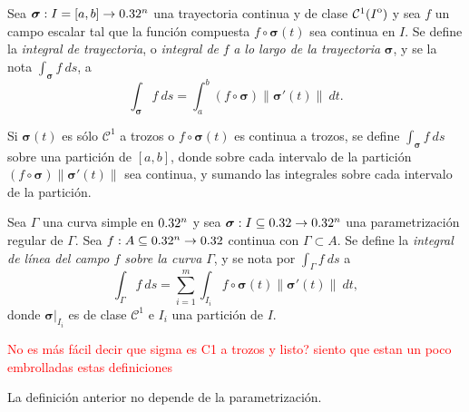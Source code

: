 \begin{definition}
    Sea $\boldsymbol{\sigma}:I=[a,b]\to0.32^n$ una trayectoria continua y de clase $\mathcal{C}^1({\kern0ptI}^{\mathrm{o}})$ y sea $f$ un campo escalar tal que la funci\'on compuesta $f\circ\boldsymbol{\sigma}(t)$ sea continua en $I$. Se define la \emph{integral de trayectoria}, o \emph{integral de} $f$ \emph{a lo largo de la trayectoria} $\boldsymbol{\sigma}$, y se la nota $\int_{\boldsymbol{\sigma}}f\:ds$, a
    \[
        \int_{\boldsymbol{\sigma}}f\:ds=\int_a^b (f\circ\boldsymbol{\sigma})\|\boldsymbol{\sigma}'(t)\|\:dt.
    \]
\end{definition}

Si $\boldsymbol{\sigma}(t)$ es s\'olo $\mathcal{C}^1$ a trozos o $f\circ\boldsymbol{\sigma}(t)$ es continua a trozos, se define $\int_{\boldsymbol{\sigma}}f\:ds$ sobre una partici\'on de $[a,b]$, donde sobre cada intervalo de la partici\'on $(f\circ\boldsymbol{\sigma})\|\boldsymbol{\sigma}'(t)\|$ sea continua, y sumando las integrales sobre cada intervalo de la partici\'on. 

\begin{definition}\label{def:int_de_linea}
    Sea $\Gamma$ una curva simple en $0.32^n$ y sea $\boldsymbol{\sigma}:I\subseteq0.32\to0.32^n$ una parametrizaci\'on regular de $\Gamma$.  Sea $f:A\subseteq0.32^n\to0.32$ continua con $\Gamma \subset A$.  Se define la \emph{integral de l\'inea del campo $f$ sobre la curva} $\Gamma$, y se nota por $\int_{\Gamma}f\:ds$ a
    \[
        \int_{\Gamma}f\:ds=\sum_{i=1}^{m}\int_{I_i}f\circ\boldsymbol{\sigma}(t)\|\boldsymbol{\sigma}'(t)\|\:dt,  
    \]
    donde $\boldsymbol{\sigma}\lvert_{I_i}$ es de clase $\mathcal{C}^1$ e $I_i$ una partici\'on de $I$.

    \textcolor{red}{No es m\'as f\'acil decir que sigma es C1 a trozos y listo? siento que estan un poco embrolladas estas definiciones}
\end{definition}

\begin{obs} La definici\'on anterior no depende de la parametrizaci\'on.
\end{obs} 

